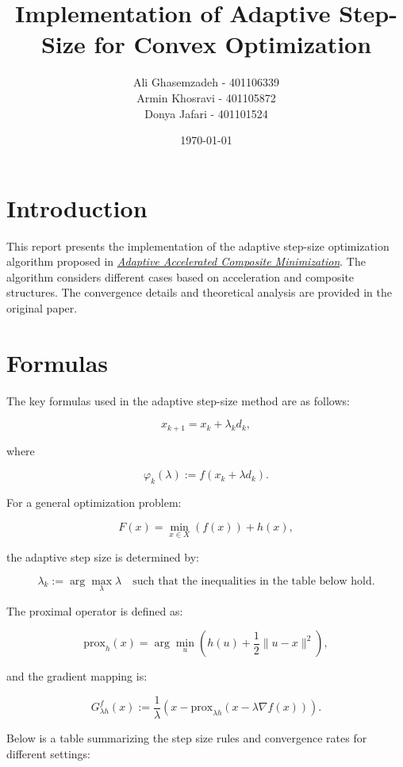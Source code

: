 \documentclass{article}
\title{Implementation of Adaptive Step-Size for Convex Optimization}
\author{
    Ali Ghasemzadeh - 401106339 \\
    Armin Khosravi - 401105872 \\
    Donya Jafari - 401101524
}
\date{\today}
\begin{document}
\maketitle

\section{Introduction}

This report presents the implementation of the adaptive step-size optimization algorithm proposed in 
\href{https://www.dcsc.tudelft.nl/~mohajerin/Publications/journal/2024/adap_stepsize.pdf}
{\textit{Adaptive Accelerated Composite Minimization}}. The algorithm considers different cases based on acceleration and composite structures. The convergence details and theoretical analysis are provided in the original paper.

\section{Formulas}

The key formulas used in the adaptive step-size method are as follows:

\[
x_{k+1} = x_k + \lambda_k d_k,
\]

where

\[
\varphi_k(\lambda) := f(x_k + \lambda d_k).
\]

For a general optimization problem:

\[
F(x) = \min_{x \in X} \left( f(x) \right) + h(x),
\]

the adaptive step size is determined by:

\[
\lambda_k := \arg\max_{\lambda} \lambda \quad \text{such that the inequalities in the table below hold}.
\]

The proximal operator is defined as:

\[
\text{prox}_h(x) = \arg\min_u \left( h(u) + \frac{1}{2} \|u - x\|^2 \right),
\]

and the gradient mapping is:

\[
G_{\lambda h}^f(x) := \frac{1}{\lambda} \left( x - \text{prox}_{\lambda h}(x - \lambda \nabla f(x)) \right).
\]

Below is a table summarizing the step size rules and convergence rates for different settings:
\end{document}
